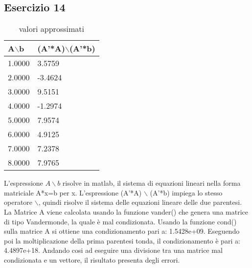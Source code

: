 \subsection{Esercizio 14}

\begin{table}[h]
\begin{tabular}{|l l|}
        \hline
        A$\backslash$b & (A’*A)$\backslash$(A’*b)\\
        \hline
        1.0000& 3.5759 \\
    	2.0000&-3.4624   \\
    	3.0000&  9.5151\\
    	4.0000&-1.2974\\
    	5.0000& 7.9574\\
    	6.0000& 4.9125\\
    	7.0000& 7.2378\\
    	8.0000& 7.9765\\
        \hline
\end{tabular}
\caption{valori approssimati}
\label{tab:14}     
\end{table}

L'espressione $A \backslash b$ risolve in matlab,  il sistema di equazioni lineari nella forma matriciale A*x=b per x.
L'espressione (A'*A) $\backslash$ (A'*b) impiega lo stesso operatore $\backslash$, quindi risolve il sistema delle equazioni lineare delle due parentesi.
La Matrice A viene calcolata usando la funzione vander() che genera una matrice di tipo Vandermonde, la quale è  mal condizionata. Usando la funzione cond() sulla matrice A si ottiene una condizionamento pari a: 1.5428e+09. Eseguendo poi la moltiplicazione della prima 
parentesi tonda, il condizionamento è pari a: 4.4897e+18. Andando cosi ad eseguire una divisione tra una matrice mal condizionata e un vettore, il risultato presenta degli errori.